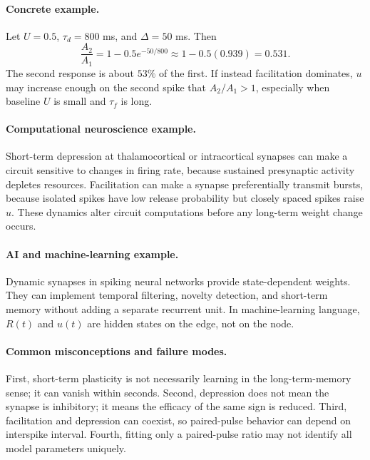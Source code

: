 \paragraph{Concrete example.}
Let \(U=0.5\), \(\tau_d=800\) ms, and \(\Delta=50\) ms. Then
\[
\frac{A_2}{A_1}=1-0.5e^{-50/800}
\approx 1-0.5(0.939)=0.531.
\]
The second response is about \(53\%\) of the first. If instead facilitation dominates, \(u\) may increase enough on the second spike that \(A_2/A_1>1\), especially when baseline \(U\) is small and \(\tau_f\) is long.

\paragraph{Computational neuroscience example.}
Short-term depression at thalamocortical or intracortical synapses can make a circuit sensitive to changes in firing rate, because sustained presynaptic activity depletes resources. Facilitation can make a synapse preferentially transmit bursts, because isolated spikes have low release probability but closely spaced spikes raise \(u\). These dynamics alter circuit computations before any long-term weight change occurs.

\paragraph{AI and machine-learning example.}
Dynamic synapses in spiking neural networks provide state-dependent weights. They can implement temporal filtering, novelty detection, and short-term memory without adding a separate recurrent unit. In machine-learning language, \(R(t)\) and \(u(t)\) are hidden states on the edge, not on the node.

\paragraph{Common misconceptions and failure modes.}
First, short-term plasticity is not necessarily learning in the long-term-memory sense; it can vanish within seconds. Second, depression does not mean the synapse is inhibitory; it means the efficacy of the same sign is reduced. Third, facilitation and depression can coexist, so paired-pulse behavior can depend on interspike interval. Fourth, fitting only a paired-pulse ratio may not identify all model parameters uniquely.

